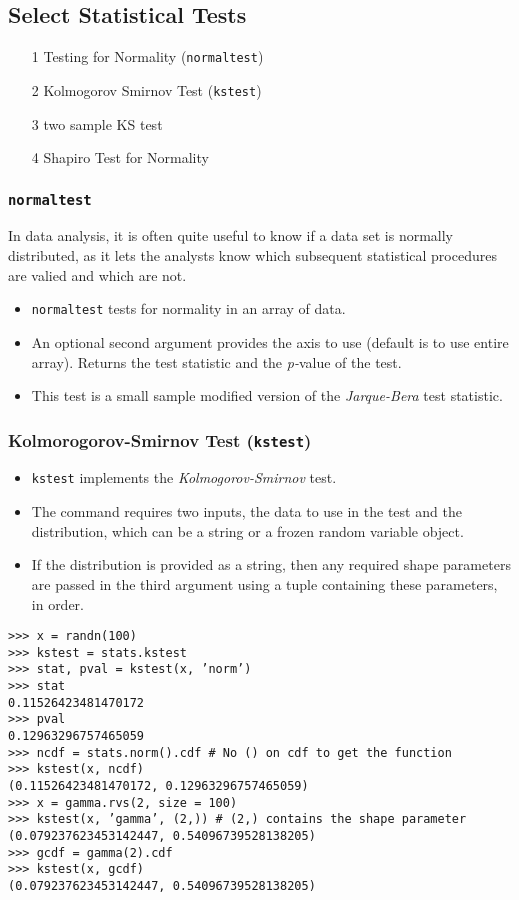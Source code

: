 \documentclass[KSmain.tex]{subfiles}
\begin{document}
 
	\large
\subsection*{Select Statistical Tests}

\begin{itemize}
\item[1] Testing for Normality  (\texttt{normaltest})
\item[2] Kolmogorov Smirnov Test (\texttt{kstest})
\item[3] two sample KS test
\item[4] Shapiro Test for Normality
\end{itemize}

\subsubsection*{\texttt{normaltest}}
In data analysis, it is often quite useful to know if a data set is normally distributed, as it lets the analysts know which subsequent statistical procedures are valied and which are not.
\begin{itemize}
\item \texttt{normaltest} tests for normality in an array of data. 
\item An optional second argument provides the axis to use
(default is to use entire array). Returns the test statistic and the \textit{p-}value of the test. 
\item This test is a small
sample modified version of the \textit{Jarque-Bera} test statistic.
\end{itemize}
\bigskip
\subsubsection*{Kolmorogorov-Smirnov Test (\texttt{kstest})}

\begin{itemize}
\item \texttt{kstest} implements the \textit{Kolmogorov-Smirnov} test. 
\item The command requires two inputs, the data to use in the test and the
distribution, which can be a string or a frozen random variable object.
\item  If the distribution is provided as
a string, then any required shape parameters are passed in the third argument using a tuple containing
these parameters, in order.
\end{itemize}
\begin{framed}
\begin{verbatim}
>>> x = randn(100)
>>> kstest = stats.kstest
>>> stat, pval = kstest(x, ’norm’)
>>> stat
0.11526423481470172
>>> pval
0.12963296757465059
>>> ncdf = stats.norm().cdf # No () on cdf to get the function
>>> kstest(x, ncdf)
(0.11526423481470172, 0.12963296757465059)
>>> x = gamma.rvs(2, size = 100)
>>> kstest(x, ’gamma’, (2,)) # (2,) contains the shape parameter
(0.079237623453142447, 0.54096739528138205)
>>> gcdf = gamma(2).cdf
>>> kstest(x, gcdf)
(0.079237623453142447, 0.54096739528138205)
\end{verbatim}
\end{framed}
\bigskip
\end{document}
